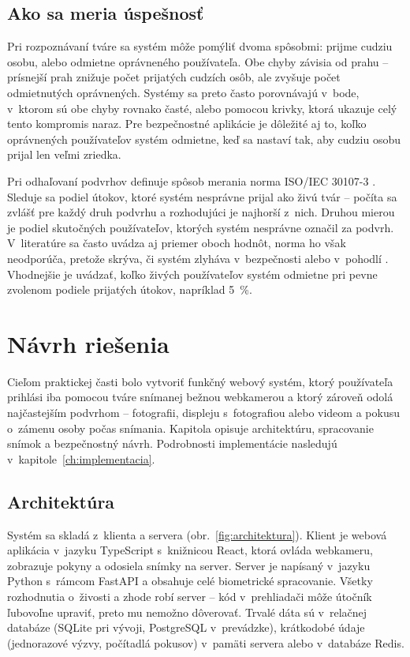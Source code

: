 \documentclass[12pt,a4paper,oneside]{report}
\begin{document}
\section{Ako sa meria úspešnosť}

Pri rozpoznávaní tváre sa systém môže pomýliť dvoma spôsobmi: prijme cudziu osobu, alebo
odmietne oprávneného používateľa. Obe chyby závisia od prahu -- prísnejší prah znižuje
počet prijatých cudzích osôb, ale zvyšuje počet odmietnutých oprávnených. Systémy sa
preto často porovnávajú v~bode, v~ktorom sú obe chyby rovnako časté, alebo pomocou
krivky, ktorá ukazuje celý tento kompromis naraz. Pre bezpečnostné aplikácie je
dôležité aj to, koľko oprávnených používateľov systém odmietne, keď sa nastaví tak, aby
cudziu osobu prijal len veľmi zriedka.

Pri odhaľovaní podvrhov definuje spôsob merania norma ISO/IEC 30107-3 \cite{iso30107-3}.
Sleduje sa podiel útokov, ktoré systém nesprávne prijal ako živú tvár -- počíta sa zvlášť
pre každý druh podvrhu a rozhodujúci je najhorší z~nich. Druhou mierou je podiel
skutočných používateľov, ktorých systém nesprávne označil za podvrh. V~literatúre sa
často uvádza aj priemer oboch hodnôt, norma ho však neodporúča, pretože skrýva, či systém
zlyháva v~bezpečnosti alebo v~pohodlí \cite{busch2023standards}. Vhodnejšie je uvádzať,
koľko živých používateľov systém odmietne pri pevne zvolenom podiele prijatých útokov,
napríklad 5~\%.

\chapter{Návrh riešenia}
\label{ch:navrh}

Cieľom praktickej časti bolo vytvoriť funkčný webový systém, ktorý používateľa
prihlási iba pomocou tváre snímanej bežnou webkamerou a ktorý zároveň odolá
najčastejším podvrhom -- fotografii, displeju s~fotografiou alebo videom a pokusu
o~zámenu osoby počas snímania. Kapitola opisuje architektúru, spracovanie snímok
a bezpečnostný návrh. Podrobnosti implementácie nasledujú v~kapitole~\ref{ch:implementacia}.

\section{Architektúra}

Systém sa skladá z~klienta a servera (obr.~\ref{fig:architektura}). Klient je webová
aplikácia v~jazyku TypeScript s~knižnicou React, ktorá ovláda webkameru, zobrazuje pokyny
a odosiela snímky na server. Server je napísaný v~jazyku Python s~rámcom FastAPI
a obsahuje celé biometrické spracovanie. Všetky rozhodnutia o~živosti a zhode robí
server -- kód v~prehliadači môže útočník ľubovoľne upraviť, preto mu nemožno dôverovať.
Trvalé dáta sú v~relačnej databáze (SQLite pri vývoji, PostgreSQL v~prevádzke),
krátkodobé údaje (jednorazové výzvy, počítadlá pokusov) v~pamäti servera alebo
v~databáze Redis.
\end{document}

